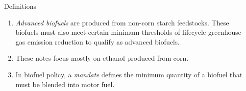 \documentclass[table,xcolor=pdftex,dvipsnames]{beamer}\usepackage[]{graphicx}\usepackage[]{color}
\begin{document}

\begin{frame}{Definitions}
\begin{enumerate}[label=\textbullet]
    \item \emph{Advanced biofuels} are produced from non-corn starch feedstocks. These biofuels must also meet certain minimum thresholds of lifecycle greenhouse gas emission reduction to qualify as advanced biofuels.
    \item These notes focus mostly on ethanol produced from corn.
    \item In biofuel policy, a \emph{mandate} defines the minimum quantity of a biofuel that must be blended into motor fuel.
\end{enumerate}
\end{frame}

\end{document}
